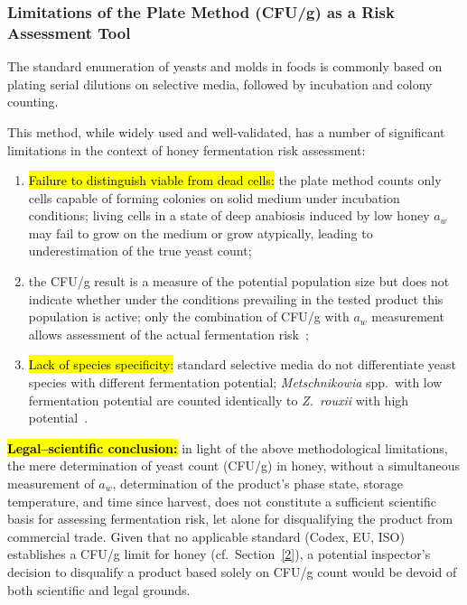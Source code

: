 \documentclass[foods,review,accept,pdftex,moreauthors]{Definitions/mdpi}
\begin{document}
{\subsubsection{Limitations of the Plate Method (CFU/g) as a Risk Assessment Tool}


The standard enumeration of yeasts and molds in foods is commonly based on plating serial dilutions on selective media, followed by incubation and colony counting.


This method, while widely used and well-validated, has a number of significant
limitations in the context of honey fermentation risk assessment:


\begin{enumerate}
    \item \hl{Failure to distinguish viable from dead cells:}
          the plate method counts only cells capable of forming
          colonies on solid medium under incubation conditions;
          living cells in a state of deep anabiosis induced by
          low honey $a_w$ may fail to grow on the medium or grow
          atypically, leading to underestimation of the true yeast
          count;
    \item {} the
          CFU/g result is a measure of the potential population size
          but does not indicate whether under the conditions prevailing
          in the tested product this population is active;
          only the combination of CFU/g with $a_w$ measurement allows
          assessment of the actual fermentation
          risk~\cite{ruegg1981};
    \item \hl{Lack of species specificity:} standard selective
          media do not differentiate yeast species with different
          fermentation potential; \textit{Metschnikowia}
          spp.\ with low fermentation potential are counted
          identically to \textit{Z.~rouxii} with high
          potential~\cite{rodriguezmachado2024}.
\end{enumerate}

\textbf{\hl{Legal--scientific conclusion:} %
} in light of the above
methodological limitations, the mere determination of yeast count
(CFU/g) in honey, without a simultaneous measurement of $a_w$,
determination of the product's phase state, storage temperature,
and time since harvest, does not constitute a sufficient scientific
basis for assessing fermentation risk, let alone for disqualifying
the product from commercial trade. Given that no applicable standard
(Codex, EU, ISO) establishes a CFU/g limit for honey
(cf.~Section~\ref{2}), a potential inspector's decision to disqualify
a product based solely on CFU/g count would be devoid of both
scientific and legal grounds.


}
\end{document}
